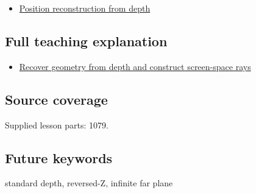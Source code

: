 \begin{itemize}
\tightlist
\item
  \hyperref[appendix-2cbf2968e866]{Position reconstruction from depth}
\end{itemize}

\subsection{Full teaching explanation}\label{appendix-1bc40b08db4a-full-teaching-explanation}

\begin{itemize}
\tightlist
\item
  \hyperref[02-foundations-ii-ch035-recover-geometry-from-depth-and-construct-screen-space-rays]{Recover geometry from depth and construct screen-space rays}
\end{itemize}

\subsection{Source coverage}\label{appendix-1bc40b08db4a-source-coverage}

Supplied lesson parts: 1079.

\subsection{Future keywords}\label{appendix-1bc40b08db4a-future-keywords}

standard depth, reversed-Z, infinite far plane
